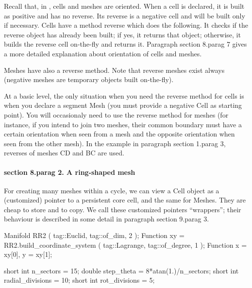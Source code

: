 Recall that, in \maniFEM, cells and meshes are oriented.
When a cell is declared, it is built as positive and has no reverse.
Its reverse is a negative cell and will be built only if necessary.
Cells have a method {\codett reverse} which does the following.
It checks if the reverse object has already been built; if yes, it returns that object;
otherwise, it builds the reverse cell on-the-fly and returns it.
Paragraph \numb section 8.\numb parag 7 gives a more detailed explanation about
orientation of cells and meshes.

{\codett Mesh}es have also a {\codett reverse} method.
Note that reverse meshes exist always (negative meshes are temporary objects built
on-the-fly).

At a basic level, the only situation when you need the {\codett reverse} method  for cells is
when you declare a segment {\codett Mesh} (you must provide a negative {\codett Cell} as
starting point).
You will occasionaly need to use the {\codett reverse} method for meshes (for instance, if you
intend to {\codett join} two meshes, their common boundary must have a certain orientation when
seen from a mesh and the opposite orientation when seen from the other mesh).
In the example in paragraph \numb section 1.\numb parag 3,
reverses of meshes {\codett CD} and {\codett BC} are used.


\vfil\eject

\paragraph{\numb section 8.\numb parag 2. A ring-shaped mesh}

For creating many meshes within a cycle, we can view a {\codett Cell} object as a
(customized) pointer to a persistent core cell, and the same for {\codett Mesh}es.
They are cheap to store and to copy.
We call these customized pointers ``wrappers''; their behaviour is described in some detail in
paragraph \numb section 9.\numb parag 3.

\verbatim
   Manifold RR2 ( tag::Euclid, tag::of_dim, 2 );
   Function xy = RR2.build_coordinate_system ( tag::Lagrange, tag::of_degree, 1 );
   Function x = xy[0],  y = xy[1];

   short int n_sectors = 15;
   double step_theta = 8*atan(1.)/n_sectors;
   short int radial_divisions = 10;
   short int rot_divisions = 5;
\endverbatim
   
